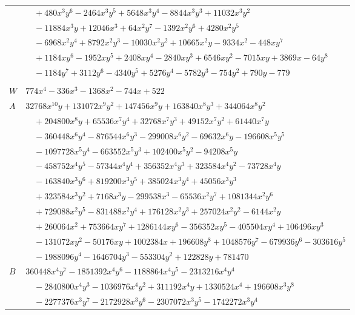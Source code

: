\documentclass[11pt]{article}
\begin{document}
\begin{longtable}{@{}ll@{}}
 & $\quad +480x^{3}y^{6}-2464x^{3}y^{5}+5648x^{3}y^{4}-8844x^{3}y^{3}+11032x^{3}y^{2}$\\
 & $\quad -11884x^{3}y+12046x^{3}+64x^{2}y^{7}-1392x^{2}y^{6}+4280x^{2}y^{5}$\\
 & $\quad -6968x^{2}y^{4}+8792x^{2}y^{3}-10030x^{2}y^{2}+10665x^{2}y-9334x^{2}-448xy^{7}$\\
 & $\quad +1184xy^{6}-1952xy^{5}+2408xy^{4}-2840xy^{3}+6546xy^{2}-7015xy+3869x-64y^{8}$\\
 & $\quad -1184y^{7}+3112y^{6}-4340y^{5}+5276y^{4}-5782y^{3}-754y^{2}+790y-779$\\
\addlinespace[3pt]
\multicolumn{2}{@{}l}{$i=6$, $m=16$, neighbours $0,9,11,13,16,28,33,38,39,40$}\\
$W$ & $774x^{4}-336x^{3}-1368x^{2}-744x+522$\\
$A$ & $32768x^{10}y+131072x^{9}y^{2}+147456x^{9}y+163840x^{8}y^{3}+344064x^{8}y^{2}$\\
 & $\quad +204800x^{8}y+65536x^{7}y^{4}+32768x^{7}y^{3}+49152x^{7}y^{2}+61440x^{7}y$\\
 & $\quad -360448x^{6}y^{4}-876544x^{6}y^{3}-299008x^{6}y^{2}-69632x^{6}y-196608x^{5}y^{5}$\\
 & $\quad -1097728x^{5}y^{4}-663552x^{5}y^{3}+102400x^{5}y^{2}-94208x^{5}y$\\
 & $\quad -458752x^{4}y^{5}-57344x^{4}y^{4}+356352x^{4}y^{3}+323584x^{4}y^{2}-73728x^{4}y$\\
 & $\quad -163840x^{3}y^{6}+819200x^{3}y^{5}+385024x^{3}y^{4}+45056x^{3}y^{3}$\\
 & $\quad +323584x^{3}y^{2}+7168x^{3}y-299538x^{3}-65536x^{2}y^{7}+1081344x^{2}y^{6}$\\
 & $\quad +729088x^{2}y^{5}-831488x^{2}y^{4}+176128x^{2}y^{3}+257024x^{2}y^{2}-6144x^{2}y$\\
 & $\quad +260064x^{2}+753664xy^{7}+1286144xy^{6}-356352xy^{5}-405504xy^{4}+106496xy^{3}$\\
 & $\quad -131072xy^{2}-50176xy+1002384x+196608y^{8}+1048576y^{7}-679936y^{6}-303616y^{5}$\\
 & $\quad -1988096y^{4}-1646704y^{3}-553304y^{2}+122828y+781470$\\
$B$ & $360448x^{4}y^{7}-1851392x^{4}y^{6}-1188864x^{4}y^{5}-2313216x^{4}y^{4}$\\
 & $\quad -2840800x^{4}y^{3}-1036976x^{4}y^{2}+311192x^{4}y+1330524x^{4}+196608x^{3}y^{8}$\\
 & $\quad -2277376x^{3}y^{7}-2172928x^{3}y^{6}-2307072x^{3}y^{5}-1742272x^{3}y^{4}$\\

\end{longtable}
\end{document}

